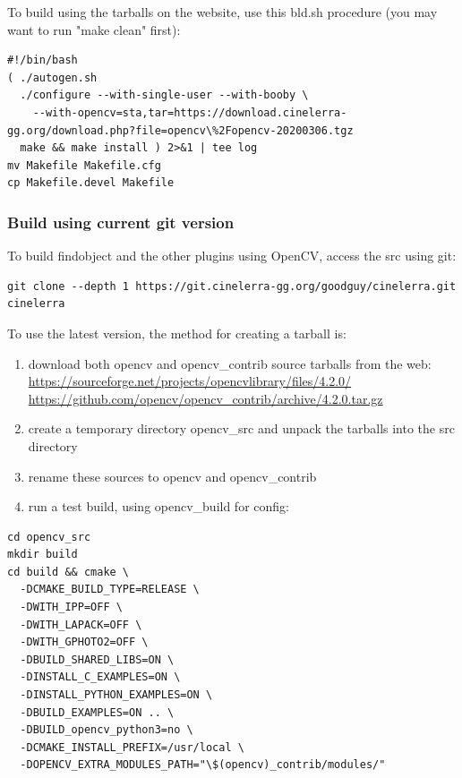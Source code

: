 To build using the tarballs on the website, use this bld.sh procedure (you may want to run "make
clean" first):
\begin{lstlisting}[style=sh]
#!/bin/bash
( ./autogen.sh
  ./configure --with-single-user --with-booby \
    --with-opencv=sta,tar=https://download.cinelerra-gg.org/download.php?file=opencv\%2Fopencv-20200306.tgz
  make && make install ) 2>&1 | tee log
mv Makefile Makefile.cfg
cp Makefile.devel Makefile
\end{lstlisting}

\subsubsection*{Build using current git version}%
\label{ssub:current_git}

To build findobject and the other plugins using OpenCV, access the src using git:

\begin{lstlisting}[style=sh]
git clone --depth 1 https://git.cinelerra-gg.org/goodguy/cinelerra.git cinelerra
\end{lstlisting}
To use the latest version, the method for creating a tarball is:
\begin{enumerate}
     \item download both opencv and opencv\_contrib source tarballs from the web:\newline
       {\small \url{https://sourceforge.net/projects/opencvlibrary/files/4.2.0/}}\newline
       {\small \url{https://github.com/opencv/opencv\_contrib/archive/4.2.0.tar.gz}}
     \item create a temporary directory opencv\_src and unpack the tarballs into the src directory
     \item rename these sources to opencv and opencv\_contrib
     \item run a test build, using opencv\_build for config:
\end{enumerate}

\begin{lstlisting}[style=sh]
cd opencv_src
mkdir build
cd build && cmake \
  -DCMAKE_BUILD_TYPE=RELEASE \
  -DWITH_IPP=OFF \
  -DWITH_LAPACK=OFF \
  -DWITH_GPHOTO2=OFF \
  -DBUILD_SHARED_LIBS=ON \ 
  -DINSTALL_C_EXAMPLES=ON \
  -DINSTALL_PYTHON_EXAMPLES=ON \
  -DBUILD_EXAMPLES=ON .. \
  -DBUILD_opencv_python3=no \
  -DCMAKE_INSTALL_PREFIX=/usr/local \
  -DOPENCV_EXTRA_MODULES_PATH="\$(opencv)_contrib/modules/"
\end{lstlisting}

